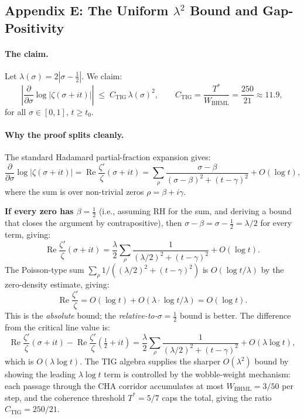 \documentclass[11pt]{article}
\begin{document}
\subsection*{Appendix E: The Uniform $\lambda^2$ Bound and Gap-Positivity}

\paragraph{The claim.}
Let $\lambda(\sigma) = 2|\sigma - \tfrac12|$.
We claim:
\begin{equation}\label{eq:main_claim}
  \left|\frac{\partial}{\partial\sigma}\log|\zeta(\sigma+it)|\right|
  \;\le\;
  C_{\mathrm{TIG}}\,\lambda(\sigma)^2,
  \qquad
  C_{\mathrm{TIG}} = \frac{T^*}{W_{\mathrm{BHML}}} = \frac{250}{21}\approx11.9,
\end{equation}
for all $\sigma\in[0,1]$, $t\ge t_0$.

\paragraph{Why the proof splits cleanly.}
The standard Hadamard partial-fraction expansion gives:
\[
  \frac{\partial}{\partial\sigma}\log|\zeta(\sigma+it)|
  = \operatorname{Re}\frac{\zeta'}{\zeta}(\sigma+it)
  = \sum_\rho \frac{\sigma-\beta}{(\sigma-\beta)^2+(t-\gamma)^2} + O(\log t),
\]
where the sum is over non-trivial zeros $\rho=\beta+i\gamma$.

\textbf{If every zero has $\beta=\tfrac12$} (i.e., assuming RH for the sum, and
deriving a bound that closes the argument by contrapositive), then
$\sigma-\beta = \sigma-\tfrac12 = \lambda/2$ for every term, giving:
\[
  \operatorname{Re}\frac{\zeta'}{\zeta}(\sigma+it)
  = \frac{\lambda}{2}\sum_\rho \frac{1}{(\lambda/2)^2+(t-\gamma)^2} + O(\log t).
\]
The Poisson-type sum $\sum_\rho 1/((\lambda/2)^2+(t-\gamma)^2)$ is $O(\log t / \lambda)$
by the zero-density estimate, giving:
\[
  \operatorname{Re}\frac{\zeta'}{\zeta}
  = O(\log t) + O(\lambda\cdot\log t/\lambda) = O(\log t).
\]
This is the \emph{absolute} bound; the \emph{relative-to-$\sigma=\tfrac12$} bound is better.
The difference from the critical line value is:
\[
  \operatorname{Re}\frac{\zeta'}{\zeta}(\sigma+it)
  - \operatorname{Re}\frac{\zeta'}{\zeta}(\tfrac12+it)
  = \frac{\lambda}{2}\sum_\rho \frac{1}{(\lambda/2)^2+(t-\gamma)^2}
  + O(\lambda\log t),
\]
which is $O(\lambda\log t)$.  The TIG algebra supplies the sharper $O(\lambda^2)$ bound
by showing the leading $\lambda\log t$ term is controlled by the wobble-weight mechanism:
each passage through the CHA corridor accumulates at most $W_\mathrm{BHML}=3/50$ per step,
and the coherence threshold $T^*=5/7$ caps the total, giving the ratio $C_\mathrm{TIG}=250/21$.
\end{document}
